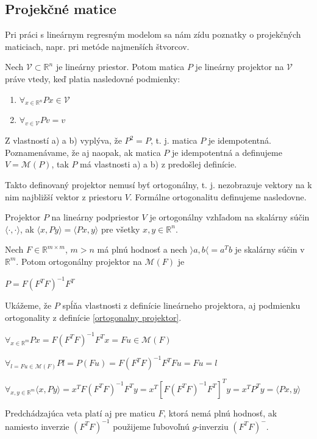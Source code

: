 \subsection{Projekčné matice}

Pri práci s lineárnym regresným modelom sa nám zídu poznatky o projekčných maticiach, napr. pri metóde najmenších štvorcov.

\begin{defin}
\label{linearny projektor}
Nech $\mathcal{V} \subset \mathbb{R}^n$ je lineárny priestor. Potom matica $P$ je lineárny projektor na $\mathcal{V}$ práve vtedy,
keď platia nasledovné podmienky:
\begin{enumerate}[label=\emph{\alph*})]
  \item
    $
    {\forall}_{x \in \mathbb{R}^n} Px \in \mathcal{V}
    $
  \item
    $
    {\forall}_{v \in \mathcal{V}} Pv = v
    $
\end{enumerate}
\end{defin}

Z vlastností a) a b) vyplýva, že $P^2 = P$, t. j. matica $P$ je idempotentná.
Poznamenávame, že aj naopak, ak matica $P$ je idempotentná a definujeme $V = \mathcal{M}(P)$, tak $P$ má vlastnosti a) a b) z predošlej definície.

Takto definovaný projektor nemusí byť ortogonálny, t. j. nezobrazuje vektory na k nim najbližší vektor z priestoru $V$.
Formálne ortogonalitu definujeme nasledovne.

\begin{defin}
\label{ortogonalny projektor}
Projektor $P$ na lineárny podpriestor $V$ je ortogonálny vzhľadom na skalárny súčin $\langle \cdot,\cdot \rangle$,
ak $\langle x, Py \rangle = \langle Px, y \rangle$ pre všetky $x, y \in \mathbb{R}^n$.
\end{defin}

\begin{theorem}
Nech $F \in \mathbb{R}^{m \times m}$, $m > n$ má plnú hodnosť a nech $\rangle a, b \langle = a^T b$ je skalárny súčin v $\mathbb{R}^m$.
Potom ortogonálny projektor na $\mathcal{M}(F)$ je
\begin{center}
$
P = F(F^T F)^{-1} F^T
$
\end{center}
\end{theorem}

\begin{dokaz}
Ukážeme, že $P$ spĺňa vlastnosti z definície lineárneho projektora, aj podmienku ortogonality z definície \ref{ortogonalny projektor}.
\begin{center}
$
{\forall}_{x \in \mathbb{R}^m} Px = F(F^T F)^{-1} F^T x = Fu \in \mathcal{M}(F)
$
\end{center}
\begin{center}
$
{\forall}_{l = Fu \in \mathcal{M}(F)} Pl = P(Fu) = F(F^T F)^{-1} F^T F u = Fu = l
$
\end{center}
\begin{center}
$
{\forall}_{x, y \in \mathbb{R}^m} \langle x, Py \rangle = x^T F(F^T F)^{-1} F^T y = x^T [F (F^T F)^{-1} F^T]^T y = x^T P^T y = \langle Px, y \rangle
$
\end{center}
\end{dokaz}

\begin{theorem}
\label{ortogonalny projektor na maticu}
Predchádzajúca veta platí aj pre maticu $F$, ktorá nemá plnú hodnosť,
ak namiesto inverzie $(F^T F)^{-1}$ použijeme ľubovoľnú $g$-inverziu $(F^T F)^{-}$.
\end{theorem}